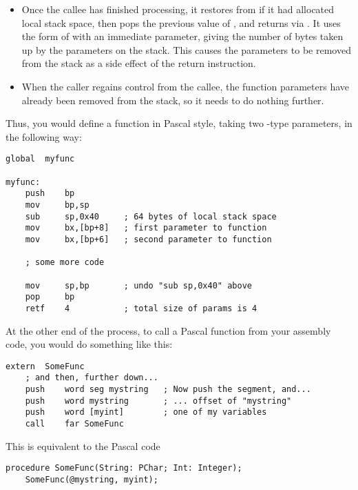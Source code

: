 \begin{itemize}
    \item{Once the callee has finished processing, it restores  from
         if it had allocated local stack space, then pops the previous
        value of , and returns via . It uses the form of
         with an immediate parameter, giving the number of bytes
        taken up by the parameters on the stack. This causes the parameters
        to be removed from the stack as a side effect of the return
        instruction.}

    \item{When the caller regains control from the callee, the function
        parameters have already been removed from the stack, so it needs to
        do nothing further.}
\end{itemize}

Thus, you would define a function in Pascal style, taking two
-type parameters, in the following way:

\begin{lstlisting}
global  myfunc

myfunc:
    push    bp
    mov     bp,sp
    sub     sp,0x40     ; 64 bytes of local stack space
    mov     bx,[bp+8]   ; first parameter to function
    mov     bx,[bp+6]   ; second parameter to function

    ; some more code

    mov     sp,bp       ; undo "sub sp,0x40" above
    pop     bp
    retf    4           ; total size of params is 4
\end{lstlisting}

At the other end of the process, to call a Pascal function from your
assembly code, you would do something like this:

\begin{lstlisting}
extern  SomeFunc
    ; and then, further down...
    push    word seg mystring   ; Now push the segment, and...
    push    word mystring       ; ... offset of "mystring"
    push    word [myint]        ; one of my variables
    call    far SomeFunc
\end{lstlisting}

This is equivalent to the Pascal code

\begin{lstlisting}
procedure SomeFunc(String: PChar; Int: Integer);
    SomeFunc(@mystring, myint);
\end{lstlisting}


